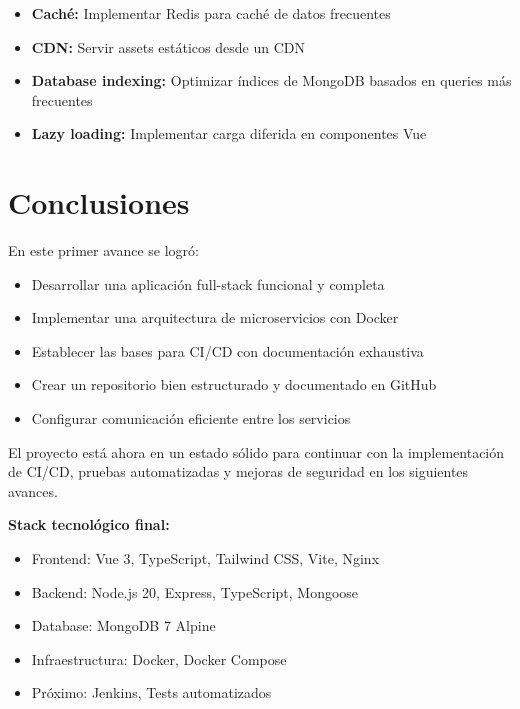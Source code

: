 \documentclass[12pt,a4paper]{article}
\begin{document}
\begin{itemize}
    \item \textbf{Caché:} Implementar Redis para caché de datos frecuentes
    \item \textbf{CDN:} Servir assets estáticos desde un CDN
    \item \textbf{Database indexing:} Optimizar índices de MongoDB basados en queries más frecuentes
    \item \textbf{Lazy loading:} Implementar carga diferida en componentes Vue
\end{itemize}

\newpage

\section{Conclusiones}

En este primer avance se logró:

\begin{itemize}
    \item Desarrollar una aplicación full-stack funcional y completa
    \item Implementar una arquitectura de microservicios con Docker
    \item Establecer las bases para CI/CD con documentación exhaustiva
    \item Crear un repositorio bien estructurado y documentado en GitHub
    \item Configurar comunicación eficiente entre los servicios
\end{itemize}

El proyecto está ahora en un estado sólido para continuar con la implementación de CI/CD, pruebas automatizadas y mejoras de seguridad en los siguientes avances.

\vspace{1cm}

\textbf{Stack tecnológico final:}
\begin{itemize}
    \item Frontend: Vue 3, TypeScript, Tailwind CSS, Vite, Nginx
    \item Backend: Node.js 20, Express, TypeScript, Mongoose
    \item Database: MongoDB 7 Alpine
    \item Infraestructura: Docker, Docker Compose
    \item Próximo: Jenkins, Tests automatizados
\end{itemize}
\end{document}
